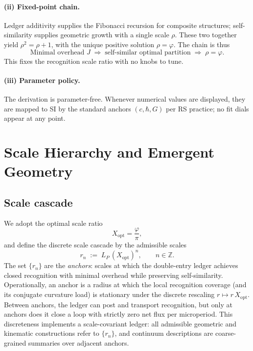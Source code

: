 \documentclass[11pt]{article}
\theoremstyle{definition}
\theoremstyle{remark}
\begin{document}
\paragraph{(ii) Fixed-point chain.}
Ledger additivity supplies the Fibonacci recursion for composite structures; self-similarity supplies geometric growth with a single scale \(\rho\). These two together yield \(\rho^2=\rho+1\), with the unique positive solution \(\rho=\varphi\). The chain is thus
\[
  \text{Minimal overhead } J\;\Longrightarrow\;\text{self-similar optimal partition}\;\Longrightarrow\;\rho=\varphi.
\]
This fixes the recognition scale ratio with no knobs to tune. %

\paragraph{(iii) Parameter policy.}
The derivation is parameter-free. Whenever numerical values are displayed, they are mapped to SI by the standard anchors \((c,\hbar,G)\) per RS practice; no fit dials appear at any point. %

\section{Scale Hierarchy and Emergent Geometry}

\subsection{Scale cascade}
We adopt the optimal scale ratio
\[
X_{\mathrm{opt}}=\frac{\varphi}{\pi},
\]
and define the discrete scale cascade by the admissible scales
\begin{equation}
\label{eq:rn}
r_n \;:=\; L_P\,(X_{\mathrm{opt}})^n,\qquad n\in\mathbb{Z}.
\end{equation}
The set $\{r_n\}$ are the \emph{anchors}: scales at which the double-entry ledger achieves closed recognition with minimal overhead while preserving self-similarity. Operationally, an anchor is a radius at which the local recognition coverage (and its conjugate curvature load) is stationary under the discrete rescaling $r\mapsto r\,X_{\mathrm{opt}}$. Between anchors, the ledger can post and transport recognition, but only at anchors does it close a loop with strictly zero net flux per microperiod. This discreteness implements a scale-covariant ledger: all admissible geometric and kinematic constructions refer to $\{r_n\}$, and continuum descriptions are coarse-grained summaries over adjacent anchors.
\end{document}
